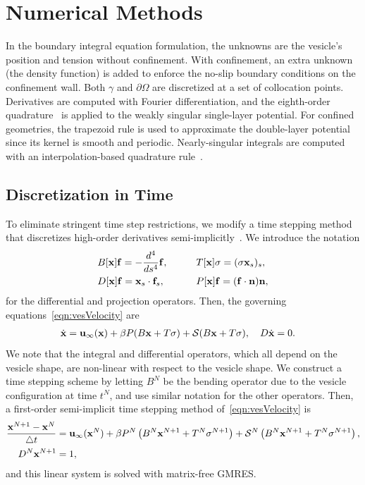 \documentclass[prb,preprint,showpacs,preprintnumbers,amsmath,amssymb,longbibliography]{revtex4-1}
\begin{document}
\section{Numerical Methods}
In the  boundary integral equation formulation, the unknowns are the
vesicle's position and tension without confinement. With confinement, an extra unknown (the density function) is added to enforce the no-slip boundary conditions on the confinement wall. Both $\gamma$ and $\partial\Omega$ are discretized at a
set of collocation points. Derivatives are computed with Fourier
differentiation, and the eighth-order quadrature~\cite{alp1999} is
applied to the weakly singular single-layer potential. For confined
geometries, the trapezoid rule is used to approximate the double-layer
potential since its kernel is smooth and periodic. Nearly-singular
integrals are computed with an interpolation-based quadrature
rule~\cite{qua-bir2014}.

\subsection{Discretization in Time}
To eliminate stringent time step restrictions, we modify a time stepping
method that discretizes high-order derivatives
semi-implicitly~\cite{vee-gue-zor-bir2009}. We introduce the notation
\begin{alignat}{3}
  &B[\mathbf{x}]\mathbf{f} = -\frac{d^4}{ds^4} \mathbf{f},  \qquad
  &&T[\mathbf{x}]\sigma = (\sigma \mathbf{x}_s)_s, \\
  &D[\mathbf{x}]\mathbf{f} = \mathbf{x}_s \cdot \mathbf{f}_s, 
  &&P[\mathbf{x}]\mathbf{f} = (\mathbf{f} \cdot \mathbf{n}) \mathbf{n},
\end{alignat}
for the differential and projection operators. Then, the
governing equations~\eqref{eqn:vesVelocity} are
\begin{align}
  \dot{\mathbf{x}} &= \mathbf{u}_\infty(\mathbf{x}) + \beta P(B\mathbf{x} + T\sigma)
  + \mathcal{S} (B\mathbf{x} + T\sigma), \quad
  D \dot{\mathbf{x}} = 0.
\end{align}
We note that the integral and differential operators, which all depend
on the vesicle shape, are non-linear with respect to the vesicle
shape. We construct a time stepping scheme by letting $B^N$ be the
bending operator due to the vesicle configuration at time $t^N$, and use
similar notation for the other operators. Then, a first-order
semi-implicit time stepping method of~\eqref{eqn:vesVelocity} is
\begin{alignat}{3}  
  \frac{\mathbf{x}^{N+1} - \mathbf{x}^N}{\triangle t} &= \mathbf{u}_\infty(\mathbf{x}^N) 
  + \beta P^N\left(B^N\mathbf{x}^{N+1} + T^N\sigma^{N+1}\right) 
  + \mathcal{S}^N\left(B^N\mathbf{x}^{N+1} + T^N\sigma^{N+1}\right),  \\
  D^N\mathbf{x}^{N+1} &= 1,
\end{alignat}
and this linear system is solved with matrix-free GMRES.
\end{document}
